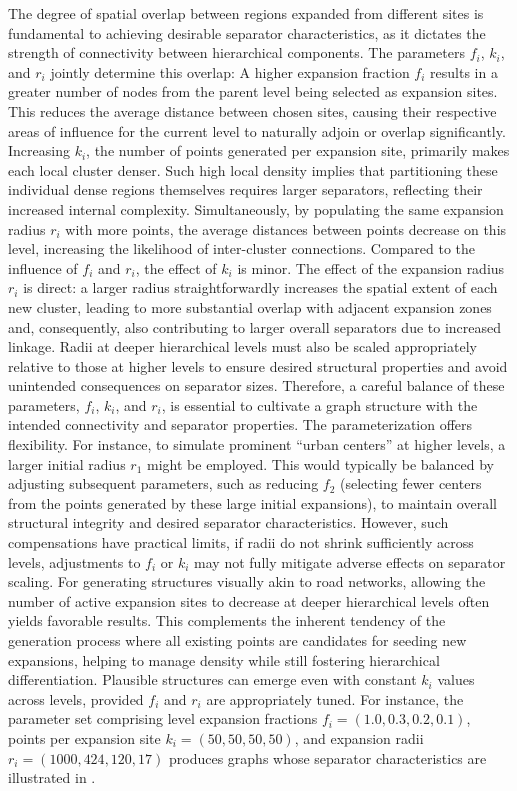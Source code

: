 The degree of spatial overlap between regions expanded from different sites is fundamental to achieving desirable separator characteristics, as it dictates the strength of connectivity between hierarchical components.
The parameters \(f_i\), \(k_i\), and \(r_i\) jointly determine this overlap:
A higher expansion fraction \(f_i\) results in a greater number of nodes from the parent level being selected as expansion sites.
This reduces the average distance between chosen sites, causing their respective areas of influence for the current level to naturally adjoin or overlap significantly.
Increasing \(k_i\), the number of points generated per expansion site, primarily makes each local cluster denser.
Such high local density implies that partitioning these individual dense regions themselves requires larger separators, reflecting their increased internal complexity.
Simultaneously, by populating the same expansion radius \(r_i\) with more points, the average distances between points decrease on this level, increasing the likelihood of inter-cluster connections.
Compared to the influence of \(f_i\) and \(r_i\), the effect of \(k_i\) is minor.
The effect of the expansion radius \(r_i\) is direct: a larger radius straightforwardly increases the spatial extent of each new cluster, leading to more substantial overlap with adjacent expansion zones and, consequently, also contributing to larger overall separators due to increased linkage.
Radii at deeper hierarchical levels must also be scaled appropriately relative to those at higher levels to ensure desired structural properties and avoid unintended consequences on separator sizes.
Therefore, a careful balance of these parameters, \(f_i\), \(k_i\), and \(r_i\), is essential to cultivate a graph structure with the intended connectivity and separator properties.
The parameterization offers flexibility.
For instance, to simulate prominent \enquote{urban centers} at higher levels, a larger initial radius \(r_1\) might be employed.
This would typically be balanced by adjusting subsequent parameters, such as reducing \(f_2\) (selecting fewer centers from the points generated by these large initial expansions), to maintain overall structural integrity and desired separator characteristics.
However, such compensations have practical limits, if radii do not shrink sufficiently across levels, adjustments to \(f_i\) or \(k_i\) may not fully mitigate adverse effects on separator scaling.
For generating structures visually akin to road networks, allowing the number of active expansion sites to decrease at deeper hierarchical levels often yields favorable results.
This complements the inherent tendency of the generation process where all existing points are candidates for seeding new expansions, helping to manage density while still fostering hierarchical differentiation.
Plausible structures can emerge even with constant \(k_i\) values across levels, provided \(f_i\) and \(r_i\) are appropriately tuned.
For instance, the parameter set comprising level expansion fractions \(f_i = (1.0, 0.3, 0.2, 0.1)\), points per expansion site \(k_i = (50, 50, 50, 50)\), and expansion radii \(r_i = (1000, 424, 120, 17)\) produces graphs whose separator characteristics are illustrated in .

